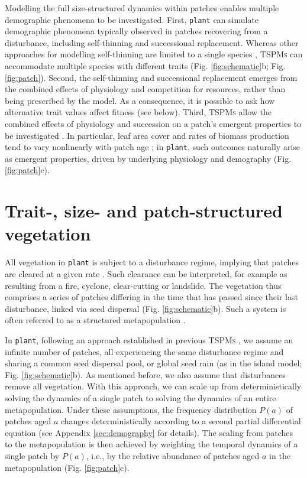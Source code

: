 \documentclass[a4paper,11pt]{article}
\newcommand{\plant}{\texttt{plant}}
\begin{document}
Modelling the full size-structured dynamics within patches enables multiple demographic phenomena to be
investigated. First, {\plant} can simulate demographic
phenomena typically observed in patches
recovering from a disturbance, including self-thinning and
successional replacement. Whereas other approaches for modelling
self-thinning are limited to a single species
\citep[e.g.,][]{Barnes-2004, Coomes-2007}, \textsc{TSPMs} can accommodate
multiple species with different traits (Fig. \ref{fig:schematic}b;
Fig. \ref{fig:patch}). Second, the self-thinning and
successional replacement emerges from the
combined effects of physiology and competition for resources, rather
than being prescribed by the model. As a consequence, it is possible to ask how alternative trait values affect fitness (see below). Third, \textsc{TSPMs} allow the combined effects of physiology and succession on a patch's emergent
properties to be investigated
\citep{Moorcroft-2001, Falster-2011}. In particular, leaf area cover and rates of biomass
production tend to vary nonlinearly with patch
age \citep{Smith-2001, Binkley-2002, Ogawa-2010};
in {\plant}, such outcomes naturally arise as emergent properties,
driven by underlying physiology and demography (Fig. \ref{fig:patch}c).

\section{Trait-, size- and patch-structured vegetation}

All vegetation in {\plant} is subject to a disturbance regime, implying that patches
are cleared at a given rate \citep[e.g.,][this issue]{Treurnicht-2016}.
Such clearance can be interpreted, for example
as resulting from a fire, cyclone, clear-cutting or
landslide. The vegetation thus comprises a series of patches
differing in the time that has passed since their last disturbance, linked via seed dispersal
(Fig. \ref{fig:schematic}b). Such a system is often referred to as a
structured metapopulation \citep{Gyllenberg-2001}.

In {\plant}, following an approach established in previous \textsc{TSPMs}
\citep{Kohyama-1993, Moorcroft-2001, Falster-2011},
we assume an infinite number of patches, all experiencing
the same disturbance regime and sharing a common seed dispersal pool, or global seed rain
(as in the island model; Fig. \ref{fig:schematic}b). As mentioned before, we also assume
that disturbances remove all vegetation. With this
approach, we can scale up from deterministically solving the dynamics of
a single patch to solving the dynamics of an entire metapopulation.
Under these assumptions, the frequency distribution \(P(a)\) of patches aged
\(a\) changes deterministically according to a second partial differential equation (see Appendix
\ref{sec:demography} for details). The scaling from patches to the
metapopulation is then achieved by weighting the temporal dynamics of
a single patch by \(P(a)\), i.e., by the relative abundance of patches aged
\(a\) in the metapopulation (Fig. \ref{fig:patch}c).
\end{document}
